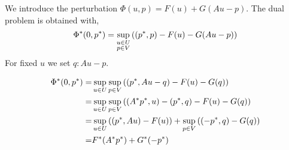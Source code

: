  We introduce the perturbation $\Phi(u, p) = F(u)+G(Au-p)$. The dual problem is obtained with,
 \[
	 {\Phi}^{\ast}(0, {p}^{\ast})=\sup_{\substack{u\in U\\ p \in V} }\left( ({p}^{\ast},p)-F(u)-G(Au-p)\right)
 \]
 For fixed $u$ we set $q: Au -p$.
 
 \begin{align*}
 {\Phi}^{\ast}(0, {p}^{\ast})=&\sup_{u\in U} \sup_{p\in V} \left(\left({p}^{\ast}, Au-q\right)-F(u)-G(q)\right)\\
 =&\sup_{u\in U} \sup_{p\in V} \left(\left({A}^{\ast}{p}^{\ast}, u\right)-({p}^{\ast}, q)-F(u)-G(q)\right)\\
 =&\sup_{u\in U}  \left(\left({p}^{\ast}, Au\right)-F(u)\right)+\sup_{p\in V}\left((-{p}^{\ast},q)-G(q)\right)\\
 =&{F}^{\ast}({A}^{\ast}{p}^{\ast})+{G}^{\ast}(-{p}^{\ast})
 \end{align*}